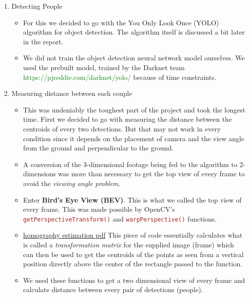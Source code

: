 \documentclass[a4paper]{article}
\begin{document}
\begin{enumerate}
    \item Detecting People
          \begin{itemize}
              \item For this we decided to go with the You Only Look Once (YOLO) algorithm for object detection. The algorithm itself is discussed a bit later in the report.
              \item We did not train the object detection neural network model ourselves. We used the prebuilt model, trained by the Darknet team \textcolor{green}{https://pjreddie.com/darknet/yolo/} because of time constraints.
          \end{itemize}

    \item Measuring distance between each couple
          \begin{itemize}
              \item This was undeniably the toughest part of the project and took the longest time. First we decided to go with measuring the distance between the centroids of every two detections. But that may not work in every condition since it depends on the placement of camera and the view angle from the ground and perpendicular to the ground.
              \item A conversion of the 3-dimensional footage being fed to the algorithm to 2-dimensions was more than necessary to get the top view of every frame to avoid the \textit{viewing angle problem}.
              \item Enter \textbf{Bird's Eye View (BEV)}. This is what we called the top view of every frame. This was made possible by OpenCV's \textcolor{brown}{\texttt{getPerspectiveTransform()}} and \textcolor{brown}{\texttt{warpPerspective()}} functions.
                    
              \item \textcolor{green}{\href{https://cseweb.ucsd.edu/classes/wi07/cse252a/homography_estimation/homography_estimation.pdf}{homography estimation pdf}} This piece of code essentially calculates what is called a \textit{transformation matrix}  for the supplied image (frame) which can then be used to get the centroids of the points as seen from a vertical position directly above the center of the rectangle passed to the function.
                    
              \item We used these functions to get a two dimensional view of every frame and calculate distance between every pair of detections (people).
          \end{itemize}


\end{enumerate}
\end{document}
